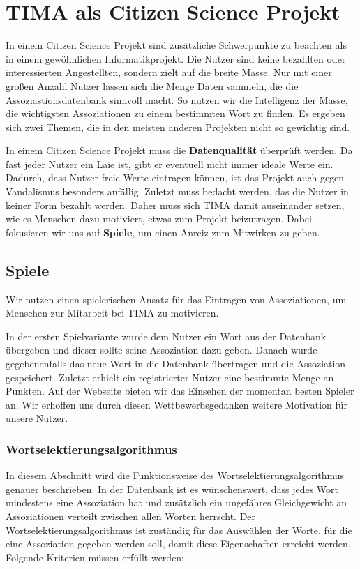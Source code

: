 \chapter{TIMA als Citizen Science Projekt}

In einem Citizen Science Projekt sind zusätzliche Schwerpunkte zu beachten als in einem gewöhnlichen Informatikprojekt. Die Nutzer sind keine bezahlten oder interessierten Angestellten, sondern zielt auf die breite Masse. Nur mit einer großen Anzahl Nutzer lassen sich die Menge Daten sammeln, die die Assoziastionsdatenbank sinnvoll macht. So nutzen wir die Intelligenz der Masse, die wichtigsten Assoziationen zu einem bestimmten Wort zu finden. Es ergeben sich zwei Themen, die in den meisten anderen Projekten nicht so gewichtig sind.

In einem Citizen Science Projekt muss die \textbf{Datenqualität} überprüft werden. Da fast jeder Nutzer ein Laie ist, gibt er eventuell nicht immer ideale Werte ein. Dadurch, dass Nutzer freie Werte eintragen können, ist das Projekt auch gegen Vandalismus besonders anfällig. Zuletzt muss bedacht werden, das die Nutzer in keiner Form bezahlt werden. Daher muss sich TIMA damit auseinander setzen, wie es Menschen dazu motiviert, etwas zum Projekt beizutragen. Dabei fokusieren wir uns auf \textbf{Spiele}, um einen Anreiz zum Mitwirken zu geben.

\section{Spiele}\label{subsec:games}
Wir nutzen einen spielerischen Ansatz für das Eintragen von Assoziationen, um Menschen zur Mitarbeit bei TIMA zu motivieren.

In der ersten Spielvariante wurde dem Nutzer ein Wort aus der Datenbank übergeben und dieser sollte seine Assoziation dazu geben. Danach wurde gegebenenfalls das neue Wort in die Datenbank übertragen und die Assoziation gespeichert. Zuletzt erhielt ein registrierter Nutzer eine bestimmte Menge an Punkten. Auf der Webseite bieten wir das Einsehen der momentan besten Spieler an. Wir erhoffen uns durch diesen Wettbewerbsgedanken weitere Motivation für unsere Nutzer.


\subsection{Wortselektierungsalgorithmus}\label{subsec:wortselektierungsalgorithmus}
In diesem Abschnitt wird die Funktionsweise des Wortselektierungsalgorithmus genauer beschrieben. In der Datenbank ist es wünschenswert, dass jedes Wort mindestens eine Assoziation hat und zusätzlich ein ungefähres Gleichgewicht an Assoziationen verteilt zwischen allen Worten herrscht. Der Wortselektierungsalgorithmus ist zuständig für das Auswählen der Worte, für die eine Assoziation gegeben werden soll, damit diese Eigenschaften erreicht werden. Folgende Kriterien müssen erfüllt werden:

